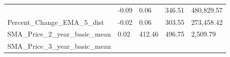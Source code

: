 \documentclass[]{article}
\begin{document}
\begin{longtable}[]{@{}lllll@{}}
\begin{minipage}[t]{0.49\columnwidth}
\end{minipage} & \begin{minipage}[t]{0.08\columnwidth}\raggedright\strut
-0.09\strut
\end{minipage} & \begin{minipage}[t]{0.09\columnwidth}\raggedright\strut
0.06\strut
\end{minipage} & \begin{minipage}[t]{0.09\columnwidth}\raggedright\strut
346.51\strut
\end{minipage} & \begin{minipage}[t]{0.11\columnwidth}\raggedright\strut
480,829.57\strut
\end{minipage}\tabularnewline
\begin{minipage}[t]{0.49\columnwidth}\raggedright\strut
Percent\_Change\_EMA\_5\_dist\strut
\end{minipage} & \begin{minipage}[t]{0.08\columnwidth}\raggedright\strut
-0.02\strut
\end{minipage} & \begin{minipage}[t]{0.09\columnwidth}\raggedright\strut
0.06\strut
\end{minipage} & \begin{minipage}[t]{0.09\columnwidth}\raggedright\strut
303.55\strut
\end{minipage} & \begin{minipage}[t]{0.11\columnwidth}\raggedright\strut
273,458.42\strut
\end{minipage}\tabularnewline
\begin{minipage}[t]{0.49\columnwidth}\raggedright\strut
SMA\_Price\_2\_year\_basic\_mean\strut
\end{minipage} & \begin{minipage}[t]{0.08\columnwidth}\raggedright\strut
0.02\strut
\end{minipage} & \begin{minipage}[t]{0.09\columnwidth}\raggedright\strut
412.46\strut
\end{minipage} & \begin{minipage}[t]{0.09\columnwidth}\raggedright\strut
496.75\strut
\end{minipage} & \begin{minipage}[t]{0.11\columnwidth}\raggedright\strut
2,509.79\strut
\end{minipage}\tabularnewline
\begin{minipage}[t]{0.49\columnwidth}\raggedright\strut
SMA\_Price\_3\_year\_basic\_mean\strut

\end{minipage}
\end{longtable}
\end{document}
